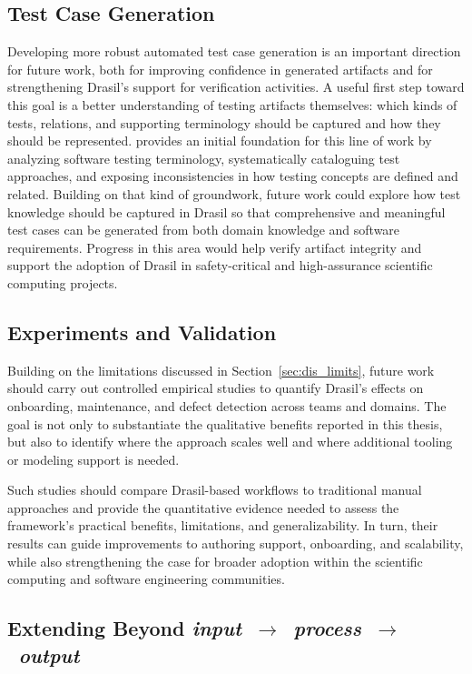 \subsection{Test Case Generation}

Developing more robust automated test case generation is an important direction
for future work, both for improving confidence in generated artifacts and for
strengthening Drasil's support for verification activities. A useful first step
toward this goal is a better understanding of testing artifacts themselves:
which kinds of tests, relations, and supporting terminology should be captured
and how they should be represented. \citet{Crawford2025} provides an initial
foundation for this line of work by analyzing software testing terminology,
systematically cataloguing test approaches, and exposing inconsistencies in how
testing concepts are defined and related. Building on that
kind of groundwork, future work could explore how test knowledge should be
captured in Drasil so that comprehensive and meaningful test cases can be
generated from both domain knowledge and software requirements. Progress in
this area would help verify artifact integrity and support the adoption of
Drasil in safety-critical and high-assurance scientific computing projects.

\subsection{Experiments and Validation}
\label{sec:fw:exp}

Building on the limitations discussed in Section~\ref{sec:dis_limits}, future 
work should carry out controlled empirical studies to quantify Drasil's effects 
on onboarding, maintenance, and defect detection across teams and domains. The 
goal is not only to substantiate the qualitative benefits reported in this 
thesis, but also to identify where the approach scales well and where 
additional tooling or modeling support is needed.

Such studies should compare Drasil-based workflows to traditional manual 
approaches and provide the quantitative evidence needed to assess the 
framework's practical benefits, limitations, and generalizability. In turn, 
their results can guide improvements to authoring support, onboarding, and 
scalability, while also strengthening the case for broader adoption within the 
scientific computing and software engineering communities.

\subsection{Extending Beyond 
\mbox{\emph{input~$\rightarrow$~process~$\rightarrow$~output}}}

